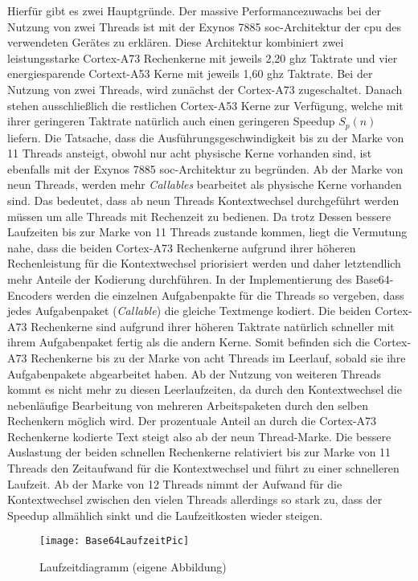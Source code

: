Hierfür gibt es zwei Hauptgründe. Der massive Performancezuwachs bei der Nutzung von zwei Threads ist mit der Exynos 7885 \ac{soc}-Architektur der \ac{cpu} des verwendeten Gerätes zu erklären. Diese Architektur kombiniert zwei leistungsstarke Cortex-A73 Rechenkerne mit jeweils 2,20 \ac{ghz} Taktrate und vier energiesparende Cortext-A53 Kerne mit jeweils 1,60 \ac{ghz} Taktrate. Bei der Nutzung von zwei Threads, wird zunächst der Cortex-A73 zugeschaltet. Danach stehen ausschließlich die restlichen Cortex-A53 Kerne zur Verfügung, welche mit ihrer geringeren Taktrate natürlich auch einen geringeren Speedup $S_{p}(n)$ liefern. Die Tatsache, dass die Ausführungsgeschwindigkeit bis zu der Marke von 11 Threads ansteigt, obwohl nur acht physische Kerne vorhanden sind, ist ebenfalls mit der Exynos 7885 \ac{soc}-Architektur zu begründen. Ab der Marke von neun Threads, werden mehr \emph{Callables} bearbeitet als physische Kerne vorhanden sind. Das bedeutet, dass ab neun Threads Kontextwechsel durchgeführt werden müssen um alle Threads mit Rechenzeit zu bedienen. Da trotz Dessen bessere Laufzeiten bis zur Marke von 11 Threads zustande kommen, liegt die Vermutung nahe, dass die beiden Cortex-A73 Rechenkerne aufgrund ihrer höheren Rechenleistung für die Kontextwechsel priorisiert werden und daher letztendlich mehr Anteile der Kodierung durchführen. In der Implementierung des Base64-Encoders werden die einzelnen Aufgabenpakte für die Threads so vergeben, dass jedes Aufgabenpaket (\emph{Callable}) die gleiche Textmenge kodiert. Die beiden Cortex-A73 Rechenkerne sind aufgrund ihrer höheren Taktrate natürlich schneller mit ihrem Aufgabenpaket fertig als die andern Kerne. Somit befinden sich die Cortex-A73 Rechenkerne bis zu der Marke von acht Threads im Leerlauf, sobald sie ihre Aufgabenpakete abgearbeitet haben. Ab der Nutzung von weiteren Threads kommt es nicht mehr zu diesen Leerlaufzeiten, da durch den Kontextwechsel die nebenläufige Bearbeitung von mehreren Arbeitspaketen durch den selben Rechenkern möglich wird. Der prozentuale Anteil an durch die Cortex-A73 Rechenkerne kodierte Text steigt also ab der neun Thread-Marke. Die bessere Auslastung der beiden schnellen Rechenkerne relativiert bis zur Marke von 11 Threads den Zeitaufwand für die Kontextwechsel und führt zu einer schnelleren Laufzeit. Ab der Marke von 12 Threads nimmt der Aufwand für die Kontextwechsel zwischen den vielen Threads allerdings so stark zu, dass der Speedup allmählich sinkt und die Laufzeitkosten wieder steigen. 

\begin{figure}[H]
	\begin{center}	 
	\texttt{[image: Base64LaufzeitPic]}
	\caption{Laufzeitdiagramm (eigene Abbildung)}
	\label{fig:Base64LaufzeitPic} 
	\end{center}
\end{figure}

